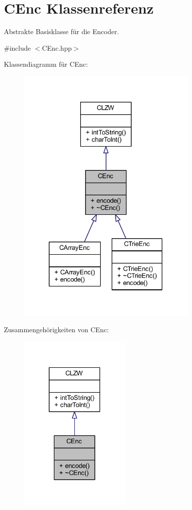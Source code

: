 \hypertarget{class_c_enc}{}\section{C\+Enc Klassenreferenz}
\label{class_c_enc}


Abstrakte Basisklasse für die Encoder.  




{\ttfamily \#include $<$C\+Enc.\+hpp$>$}



Klassendiagramm für C\+Enc\+:
\nopagebreak
\begin{figure}[H]
\begin{center}
\leavevmode
\includegraphics[width=254pt]{class_c_enc__inherit__graph}
\end{center}
\end{figure}


Zusammengehörigkeiten von C\+Enc\+:
\nopagebreak
\begin{figure}[H]
\begin{center}
\leavevmode
\includegraphics[width=158pt]{class_c_enc__coll__graph}
\end{center}
\end{figure}
